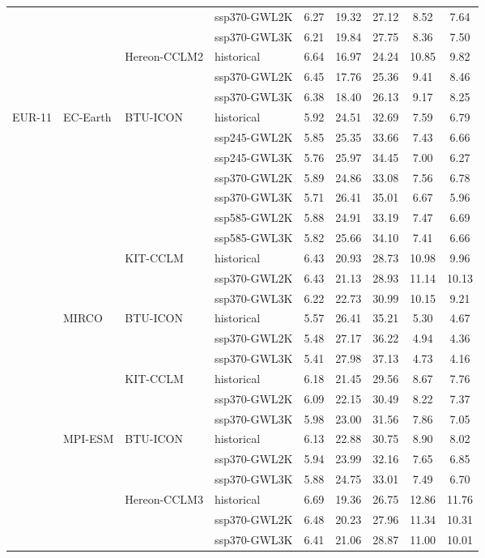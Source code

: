 \begin{table}[!htbp]
{\begin{tabular}{lll|l|c|c|c|c|c}
 &  &  & ssp370-GWL2K & 6.27 & 19.32 & 27.12 & 8.52 & 7.64 \\
 &  &  & ssp370-GWL3K & 6.21 & 19.84 & 27.75 & 8.36 & 7.50 \\
\cmidrule(lr){3-9}
 &  & \multirow{3}{*}{Hereon-CCLM2} & historical & 6.64 & 16.97 & 24.24 & 10.85 & 9.82 \\
 &  &  & ssp370-GWL2K & 6.45 & 17.76 & 25.36 & 9.41 & 8.46 \\
 &  &  & ssp370-GWL3K & 6.38 & 18.40 & 26.13 & 9.17 & 8.25 \\
\midrule
\multirow{22}{*}{EUR-11} & \multirow{10}{*}{EC-Earth} & \multirow{7}{*}{BTU-ICON} & historical & 5.92 & 24.51 & 32.69 & 7.59 & 6.79 \\
 &  &  & ssp245-GWL2K & 5.85 & 25.35 & 33.66 & 7.43 & 6.66 \\
 &  &  & ssp245-GWL3K & 5.76 & 25.97 & 34.45 & 7.00 & 6.27 \\
 &  &  & ssp370-GWL2K & 5.89 & 24.86 & 33.08 & 7.56 & 6.78 \\
 &  &  & ssp370-GWL3K & 5.71 & 26.41 & 35.01 & 6.67 & 5.96 \\
 &  &  & ssp585-GWL2K & 5.88 & 24.91 & 33.19 & 7.47 & 6.69 \\
 &  &  & ssp585-GWL3K & 5.82 & 25.66 & 34.10 & 7.41 & 6.66 \\
\cmidrule(lr){3-9}
 &  & \multirow{3}{*}{KIT-CCLM} & historical & 6.43 & 20.93 & 28.73 & 10.98 & 9.96 \\
 &  &  & ssp370-GWL2K & 6.43 & 21.13 & 28.93 & 11.14 & 10.13 \\
 &  &  & ssp370-GWL3K & 6.22 & 22.73 & 30.99 & 10.15 & 9.21 \\
\cmidrule(lr){3-9}
\cmidrule(lr){2-9}
 & \multirow{6}{*}{MIRCO} & \multirow{3}{*}{BTU-ICON} & historical & 5.57 & 26.41 & 35.21 & 5.30 & 4.67 \\
 &  &  & ssp370-GWL2K & 5.48 & 27.17 & 36.22 & 4.94 & 4.36 \\
 &  &  & ssp370-GWL3K & 5.41 & 27.98 & 37.13 & 4.73 & 4.16 \\
\cmidrule(lr){3-9}
 &  & \multirow{3}{*}{KIT-CCLM} & historical & 6.18 & 21.45 & 29.56 & 8.67 & 7.76 \\
 &  &  & ssp370-GWL2K & 6.09 & 22.15 & 30.49 & 8.22 & 7.37 \\
 &  &  & ssp370-GWL3K & 5.98 & 23.00 & 31.56 & 7.86 & 7.05 \\
\cmidrule(lr){3-9}
\cmidrule(lr){2-9}
 & \multirow{6}{*}{MPI-ESM} & \multirow{3}{*}{BTU-ICON} & historical & 6.13 & 22.88 & 30.75 & 8.90 & 8.02 \\
 &  &  & ssp370-GWL2K & 5.94 & 23.99 & 32.16 & 7.65 & 6.85 \\
 &  &  & ssp370-GWL3K & 5.88 & 24.75 & 33.01 & 7.49 & 6.70 \\
\cmidrule(lr){3-9}
 &  & \multirow{3}{*}{Hereon-CCLM3} & historical & 6.69 & 19.36 & 26.75 & 12.86 & 11.76 \\
 &  &  & ssp370-GWL2K & 6.48 & 20.23 & 27.96 & 11.34 & 10.31 \\
 &  &  & ssp370-GWL3K & 6.41 & 21.06 & 28.87 & 11.00 & 10.01 \\
\bottomrule
\end{tabular}
}
\end{table}
